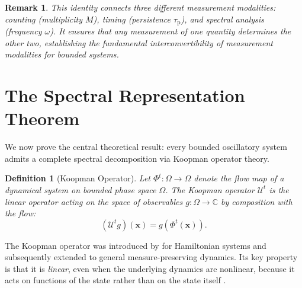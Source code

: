 \documentclass[11pt,twocolumn,a4paper]{article}
\newtheorem{definition}[theorem]{Definition}
\newtheorem{remark}[theorem]{Remark}
\newcommand{\CC}{\mathbb{C}}
\newcommand{\taup}{\tau_{\mathrm{p}}}
\begin{document}
\begin{remark}
This identity connects three different measurement modalities: counting
(multiplicity $M$), timing (persistence $\taup$), and spectral analysis
(frequency $\omega$). It ensures that any measurement of one quantity
determines the other two, establishing the fundamental interconvertibility
of measurement modalities for bounded systems.
\end{remark}


\section{The Spectral Representation Theorem}
\label{sec:spectral_representation}

We now prove the central theoretical result: every bounded oscillatory
system admits a complete spectral decomposition via Koopman operator
theory.

\begin{definition}[Koopman Operator]
\label{def:koopman}
Let $\Phi^t: \Omega \to \Omega$ denote the flow map of a dynamical
system on bounded phase space $\Omega$. The \emph{Koopman operator}
$\mathcal{U}^t$ is the linear operator acting on the space of
observables $g: \Omega \to \CC$ by composition with the flow:
\begin{equation}
\label{eq:koopman}
  (\mathcal{U}^t g)(\mathbf{x}) = g(\Phi^t(\mathbf{x})).
\end{equation}
\end{definition}

The Koopman operator was introduced by \citet{koopman1931} for
Hamiltonian systems and subsequently extended to general measure-preserving
dynamics. Its key property is that it is \emph{linear}, even when the
underlying dynamics are nonlinear, because it acts on functions of the
state rather than on the state itself \citep{mezic2005, budisic2012}.
\end{document}
